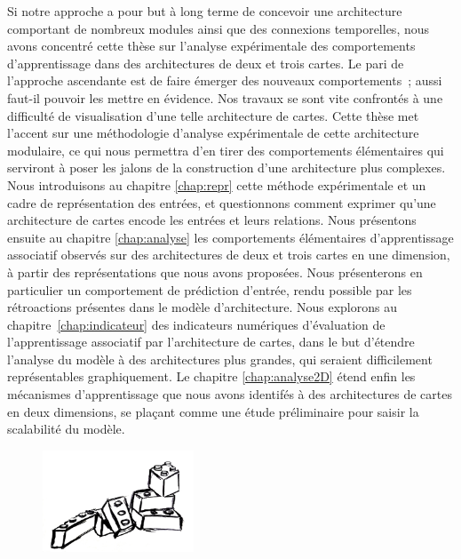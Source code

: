 Si notre approche a pour but à long terme de concevoir une architecture comportant de nombreux modules ainsi que des connexions temporelles, nous avons concentré cette thèse sur l'analyse expérimentale des comportements d'apprentissage dans des architectures de deux et trois cartes.
Le pari de l'approche ascendante est de faire émerger des nouveaux comportements~; aussi faut-il pouvoir les mettre en évidence. Nos travaux se sont vite confrontés à une difficulté de visualisation d'une telle architecture de cartes. Cette thèse met l'accent sur une méthodologie d'analyse expérimentale de cette architecture modulaire, ce qui nous permettra d'en tirer des comportements élémentaires qui serviront à poser les jalons de la construction d'une architecture plus complexes.
Nous introduisons au chapitre \ref{chap:repr} cette méthode expérimentale et un cadre de représentation des entrées, et questionnons comment exprimer qu'une architecture de cartes encode les entrées et leurs relations.
Nous présentons ensuite au chapitre \ref{chap:analyse} les comportements élémentaires d'apprentissage associatif observés sur des architectures de deux et trois cartes en une dimension, à partir des représentations que nous avons proposées. Nous présenterons en particulier un comportement de prédiction d'entrée, rendu possible par les rétroactions présentes dans le modèle d'architecture.
Nous explorons au chapitre~\ref{chap:indicateur} des indicateurs numériques d'évaluation de l'apprentissage associatif par l'architecture de cartes, dans le but d'étendre l'analyse du modèle à des architectures plus grandes, qui seraient difficilement représentables graphiquement.
Le chapitre \ref{chap:analyse2D} étend enfin les mécanismes d'apprentissage que nous avons identifés à des architectures de cartes en deux dimensions, se plaçant comme une étude préliminaire pour saisir la scalabilité du modèle.


    \begin{figure}[b]
        \vspace{1cm}
        \centering\includegraphics[width=0.4\textwidth]{lego2.jpg}
        \vspace{1cm}
    \end{figure}

